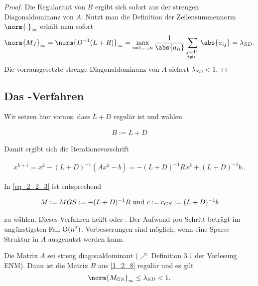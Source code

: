 \begin{proof}
	Die Regularität von $B$ ergibt sich sofort aus der strengen Diagonaldominanz von $A$. Nutzt man die Definition der Zeilensummennorm $\norm{\cdot}_{\infty}$ erhält man sofort
	\begin{align}
		\norm{M_J}_{\infty} = \norm{D^{-1}(L+R)}_{\infty} =\max_{i = 1,\dots,n} \frac{1}{\abs{a_{ii}}} \sum_{\substack{j =1 \\ j\neq i}^{n}} \abs{a_{ij}}  = \lambda_{SD}.\notag
	\end{align}
	Die vorrausgesetzte strenge Diagonaldominanz von $A$ sichert $\lambda_{SD} < 1$.
\end{proof}

\subsection{Das -Verfahren}
Wir setzen hier voraus, dass $L + D$ regulär ist und wählen

\begin{align}
	B := L + D \label{1_2_8}
\end{align}

Damit ergibt sich die Iterationsvorschrift

\begin{align}
	x^{k+1} = x^k - (L+D)^{-1}(Ax^k - b) = - (L+D)^{-1}R x^k + (L+D)^{-1}b. \label{1_2_9}.
\end{align}

In \cref{eq_2_2_3} ist entsprechend

\begin{align}
	M:= M{GS} := - (L+D)^{-1}R \text{ und } c:= c_{GS} := (L+D)^{-1}b \notag
\end{align}

zu wählen. Dieses Verfahren heißt  oder . Der Aufwand pro Schritt beträgt im ungünstigsten Fall $\operatorname{O}(n^2)$. Verbesserungen sind möglich, wenn eine Sparse-Struktur in $A$ ausgenutzt werden kann.

\begin{proposition}
	Die Matrix $A$ sei streng diagonaldominant ($\nearrow$ Definition 3.1 der Vorlesung ENM). Dann ist die Matrix $B$ aus \cref{1_2_8} regulär und es gilt
	\begin{align}
		\norm{M_{GS}}_{\infty} \le \lambda_{SD} <1. \notag
	\end{align}
\end{proposition}

